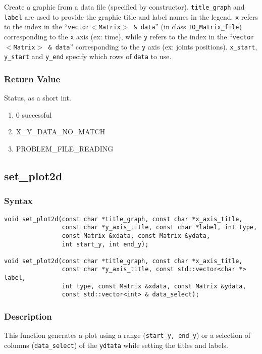 \documentclass[11pt,fleqn,letterpaper]{report}
\begin{document}
Create a graphic from a data file (specified by constructor).
\texttt{title\_graph} and \texttt{label} are used to provide the
graphic title and label names in the legend. \texttt{x} refers to the
index in the ``\texttt{vector$<$Matrix$>$ \& data}'' (in class
\texttt{IO\_Matrix\_file}) corresponding to the \texttt{x} axis (ex:
time), while \texttt{y} refers to the index in the
``\texttt{vector$<$Matrix$>$ \& data}'' corresponding to the
\texttt{y} axis (ex: joints positions). \texttt{x\_start},
\texttt{y\_start} and \texttt{y\_end} specify which rows of
\texttt{data} to use.


\subsubsection*{Return Value}
Status, as a short int.
\begin{enumerate}
\item[] 0 successful
\item[] X\_Y\_DATA\_NO\_MATCH
\item[] PROBLEM\_FILE\_READING
\end{enumerate}

 \newpage 

\subsection*{set\_plot2d}
\subsubsection*{Syntax}
\begin{verbatim}
void set_plot2d(const char *title_graph, const char *x_axis_title, 
                const char *y_axis_title, const char *label, int type, 
                const Matrix &xdata, const Matrix &ydata,
                int start_y, int end_y);

void set_plot2d(const char *title_graph, const char *x_axis_title, 
                const char *y_axis_title, const std::vector<char *> label,
                int type, const Matrix &xdata, const Matrix &ydata,
                const std::vector<int> & data_select);
\end{verbatim}
\subsubsection*{Description}
This function generates a plot using a range (\texttt{start\_y,
  end\_y}) or a selection of columns (\texttt{data\_select}) of the
\texttt{ydtata} while setting the titles and labels.
\end{document}
